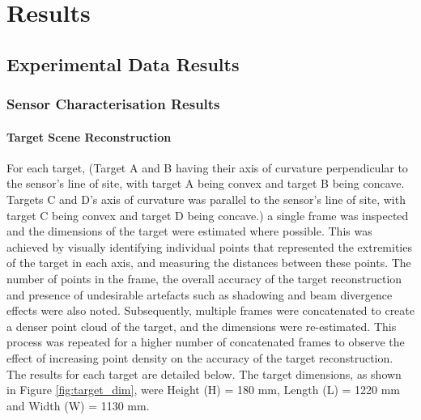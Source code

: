\chapter{Results}
\label{ch:results}
\section{Experimental Data Results}
\label{sec:ch7.section1}

\subsection{Sensor Characterisation Results}
\label{subsec:ch7.section1.subsec1}

\subsubsection{Target Scene Reconstruction}
\label{subsubsec:ch7.section1.subsec1.subsubsection1}

For each target, (Target A and B having their axis of curvature perpendicular to the sensor's line of site, with target A being convex and target B being concave. Targets C and D's axis of curvature was parallel to the sensor's line of site, with target C being convex and target D being concave.) a single frame was inspected and the dimensions of the target were estimated where possible. This was achieved by visually identifying individual points that represented the extremities of the target in each axis, and measuring the distances between these points. The number of points in the frame, the overall accuracy of the target reconstruction and presence of undesirable artefacts such as shadowing and beam divergence effects were also noted. Subsequently, multiple frames were concatenated to create a denser point cloud of the target, and the dimensions were re-estimated. This process was repeated for a higher number of concatenated frames to observe the effect of increasing point density on the accuracy of the target reconstruction. The results for each target are detailed below. The target dimensions, as shown in Figure \ref{fig:target_dim}, were Height (H) = 180 mm, Length (L) = 1220 mm and Width (W) = 1130 mm. 

